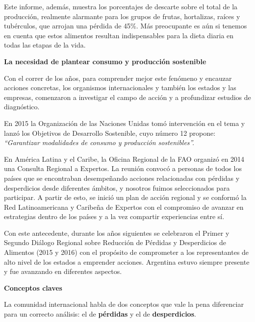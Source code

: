 Este informe, además, muestra los porcentajes de descarte sobre el total
de la producción, realmente alarmante para los grupos de frutas,
hortalizas, raíces y tubérculos, que arrojan una pérdida de 45\%. Más
preocupante es aún si tenemos en cuenta que estos alimentos resultan
indispensables para la dieta diaria en todas las etapas de la vida.

\textbf{La necesidad de plantear consumo y producción sostenible}

Con el correr de los años, para comprender mejor este fenómeno y
encauzar acciones concretas, los organismos internacionales y también
los estados y las empresas, comenzaron a investigar el campo de acción y
a profundizar estudios de diagnóstico.

En 2015 la Organización de las Naciones Unidas tomó intervención en el
tema y lanzó los Objetivos de Desarrollo Sostenible, cuyo número 12
propone: \emph{``Garantizar modalidades de consumo y producción
sostenibles''.}

En América Latina y el Caribe, la Oficina Regional de la FAO organizó en
2014 una Consulta Regional a Expertos. La reunión convocó a personas de
todos los países que se encontraban desempeñando acciones relacionadas
con pérdidas y desperdicios desde diferentes ámbitos, y nosotros fuimos
seleccionados para participar. A partir de esto, se inició un plan de
acción regional y se conformó la Red Latinoamericana y Caribeña de
Expertos con el compromiso de avanzar en estrategias dentro de los
países y a la vez compartir experiencias entre sí.

Con este antecedente, durante los años siguientes se celebraron el
Primer y Segundo Diálogo Regional sobre Reducción de Pérdidas y
Desperdicios de Alimentos (2015 y 2016) con el propósito de comprometer
a los representantes de alto nivel de los estados a emprender acciones.
Argentina estuvo siempre presente y fue avanzando en diferentes
aspectos.

\textbf{Conceptos claves}

La comunidad internacional habla de dos conceptos que vale la pena
diferenciar para un correcto análisis: el de \textbf{pérdidas} y el de
\textbf{desperdicios}.

